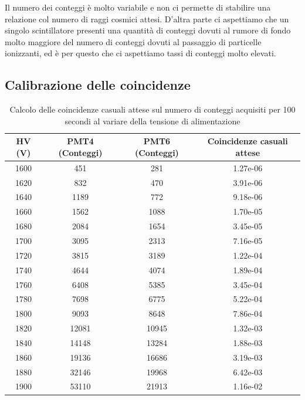 \documentclass[a4paper,10pt]{article}
\begin{document}
Il numero dei conteggi è molto variabile e non ci permette di stabilire una relazione col numero di raggi cosmici attesi. D'altra parte ci aspettiamo che un singolo scintillatore presenti una quantità di conteggi dovuti al rumore di fondo molto maggiore del numero di conteggi dovuti al passaggio di particelle ionizzanti, ed è per questo che ci aspettiamo tassi di conteggi molto elevati.

\subsection{Calibrazione delle coincidenze}
\begin{table}
\centering
\begin{tabular}{|c|c|c|c|}
\hline
\textbf{HV (V)} & \textbf{PMT4 (Conteggi)} & \textbf{PMT6 (Conteggi)} & \textbf{Coincidenze casuali attese} \\
\hline 
1600 & 451 & 281 & 1.27e-06 \\
\hline
1620 & 832 & 470 & 3.91e-06 \\
\hline
1640 & 1189 & 772 & 9.18e-06 \\
\hline
1660 & 1562 & 1088 & 1.70e-05 \\
\hline
1680 & 2084 & 1654 & 3.45e-05 \\
\hline
1700 & 3095 & 2313 & 7.16e-05 \\
\hline
1720 & 3815 & 3189 & 1.22e-04 \\
\hline
1740 & 4644 & 4074 & 1.89e-04 \\
\hline
1760 & 6408 & 5385 & 3.45e-04 \\
\hline
1780 & 7698 & 6775 & 5.22e-04 \\
\hline
1800 & 9093 & 8648 & 7.86e-04 \\
\hline
1820 & 12081 & 10945 & 1.32e-03 \\
\hline
1840 & 14148 & 13284 & 1.88e-03 \\
\hline
1860 & 19136 & 16686 & 3.19e-03 \\
\hline
1880 & 32146 & 19968 & 6.42e-03 \\
\hline
1900 & 53110 & 21913 & 1.16e-02 \\
\hline

\end{tabular} 
\caption{Calcolo delle coincidenze casuali attese sul numero di conteggi acquisiti per 100 secondi al variare della tensione di alimentazione}
\label{tab:random_coincidence}
\end{table}
\end{document}
